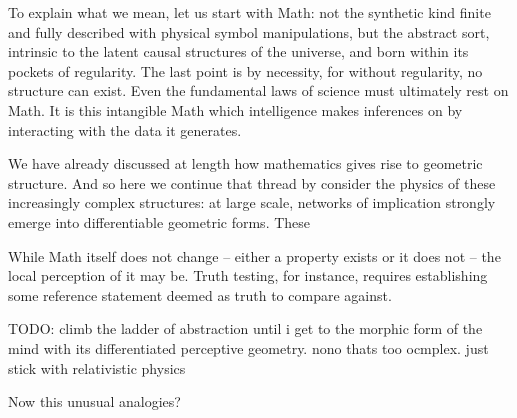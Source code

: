 To explain what we mean, let us start with Math: not the synthetic kind finite and fully described with physical symbol manipulations, but the abstract sort, intrinsic to the latent causal structures of the universe, and born within its pockets of regularity. The last point is by necessity, for without regularity, no structure can exist.  Even the fundamental laws of science must ultimately rest on Math. It is this intangible Math which intelligence makes inferences on by interacting with the data it generates.

We have already discussed at length how mathematics gives rise to geometric structure. And so here we continue that thread by consider the physics of these increasingly complex structures: at large scale, networks of implication strongly emerge into differentiable geometric forms. These 


While Math itself does not change -- either a property exists or it does not -- the local perception of it may be. Truth testing, for instance, requires establishing some reference statement deemed as truth to compare against. 

TODO: climb the ladder of abstraction until i get to the morphic form of the mind with its differentiated perceptive geometry. nono thats too ocmplex. just stick with relativistic physics




Now this unusual analogies? 
